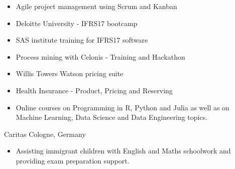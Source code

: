 \documentclass[a4paper,]{fortysecondscv}
\begin{document}

\begin{cvtable}
    \vspace{\topsep}
    \cvitemshortsingle
    {
        \begin{itemize}[nosep, leftmargin=12pt, label={-}, topsep=0pt]
            \item Agile project management using Scrum and Kanban
            \item Deloitte University - IFRS17 bootcamp
            \item SAS institute training for IFRS17 software
            \item Process mining with Celonis - Training and Hackathon
            \item Willis Towers Watson pricing suite
            \item Health Insurance - Product, Pricing and Reserving
            \item Online courses on Programming in R, Python and Julia as well as on Machine Learning, Data Science and Data Engineering topics.
        \end{itemize}
    }

\end{cvtable}


\begin{cvtable}[1.1]
    \vspace{\topsep}
    \cvitemoneblocksingle
    {Caritas}
    {Cologne, Germany}
    {
        \begin{itemize}[nosep, leftmargin=12pt, label={-}, topsep=0pt]\item Assisting immigrant children with English and Maths schoolwork and providing exam preparation support.
        \end{itemize}
    }
\end{cvtable}


\begin{cvtable}[1.1]
\end{cvtable}

\end{document}
